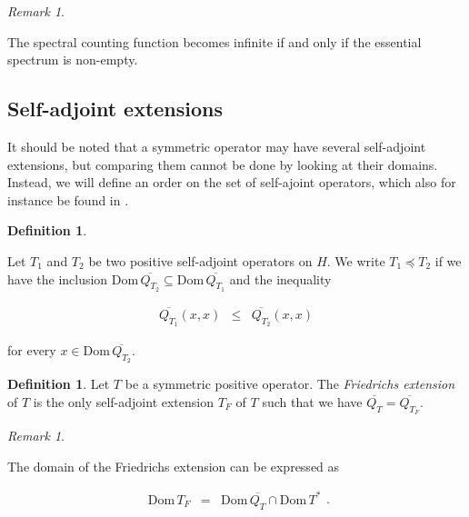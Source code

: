 \documentclass{jams-l}
\theoremstyle{definition}
\newtheorem{definition}[theorem]{Definition}
\theoremstyle{remark}
\newtheorem{remark}[theorem]{Remark}
\numberwithin{equation}{section}
\begin{document}
        \begin{remark}
        \label{RmkSpectralCountingEssentialSpectrum}
        
            The spectral counting function becomes infinite if and only if the essential spectrum is non-empty.
        
        \end{remark}
    
    
    \subsection{Self-adjoint extensions}
    
        It should be noted that a symmetric operator may have several self-adjoint extensions, but comparing them cannot be done by looking at their domains. Instead, we will define an order on the set of self-ajoint operators, which also for instance be found in \cite[Def I.5.4]{MR1102675}.
        
        \begin{definition}
        \label{DefOrderSelfAdjoint}
        
            Let $T_1$ and $T_2$ be two positive self-adjoint operators on $H$. We write $T_1 \preccurlyeq T_2$ if we have the inclusion $\mathrm{Dom} \, \overline{Q_{T_2}} \subseteq \mathrm{Dom} \, \overline{Q_{T_1}}$ and the inequality
            
            \[ \begin{array}{lll}
                    \overline{Q_{T_1}} \left( x, x \right) & \leqslant & \overline{Q_{T_2}} \left( x, x \right)
                \end{array} \]
            
            \noindent for every $x \in \mathrm{Dom} \, \overline{Q_{T_2}}$.
        
        \end{definition}
        
        \begin{definition}
        
            Let $T$ be a symmetric positive operator. The \textit{Friedrichs extension} of $T$ is the only self-adjoint extension $T_F$ of $T$ such that we have $\overline{Q_T} = \overline{Q_{T_F}}$.
        
        \end{definition}
        
        \begin{remark}
        \label{RmkDomainFriedrichs}
        
            The domain of the Friedrichs extension can be expressed as
            
            \[ \begin{array}{lll}
                    \mathrm{Dom} \, T_F & = & \mathrm{Dom} \, \overline{Q_T} \cap \mathrm{Dom} \, T^{\ast}
                \end{array} . \]
        
        \end{remark}
        
\end{document}
